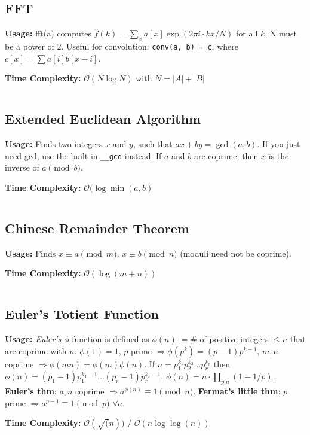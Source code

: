   \subsection{FFT}
    \par \textbf{Usage:} fft(a) computes $\hat f(k) = \sum_x a[x] \exp(2\pi i \cdot k x / N)$ for all $k$. N must be a power of 2.
   Useful for convolution:
   \texttt{conv(a, b) = c}, where $c[x] = \sum a[i]b[x-i]$.
    \par \textbf{Time Complexity:} $\mathcal{O}(N \log N)$ with $N = |A| + |B|$

    \inputminted{cpp}{library/maths/fft.cpp}

  \subsection{Extended Euclidean Algorithm}
    \par \textbf{Usage:} Finds two integers $x$ and $y$, such that $ax+by=\gcd(a,b)$. If
 you just need gcd, use the built in \texttt{\_\_gcd} instead.
 If $a$ and $b$ are coprime, then $x$ is the inverse of $a \pmod{b}$.
    \par \textbf{Time Complexity:} $\mathcal{O}(\log \min(a, b)$

    \inputminted{cpp}{library/maths/euclid.h}
  \subsection{Chinese Remainder Theorem}
    \par \textbf{Usage:} Finds $x \equiv a \pmod m$, $x \equiv b \pmod n$ (moduli need not be coprime).
    \par \textbf{Time Complexity:} $\mathcal{O}(\log(m + n))$
    \inputminted{cpp}{library/maths/crt.hpp}
  \subsection{Euler's Totient Function}
    \par \textbf{Usage:} \emph{Euler's $\phi$} function is defined as $\phi(n):=\#$ of positive integers $\leq n$ that are coprime with $n$.
  $\phi(1)=1$, $p$ prime $\Rightarrow \phi(p^k)=(p-1)p^{k-1}$, $m,n$ coprime $\Rightarrow \phi(mn)=\phi(m)\phi(n)$.
  If $n=p_1^{k_1}p_2^{k_2} ... p_r^{k_r}$ then $\phi(n) = (p_1-1)p_1^{k_1-1}...(p_r-1)p_r^{k_r-1}$.
  $\phi(n)=n \cdot \prod_{p|n}(1-1/p)$.
      \textbf{Euler's thm}: $a,n$ coprime $\Rightarrow a^{\phi(n)} \equiv 1 \pmod{n}$.
     \textbf{Fermat's little thm}: $p$ prime $\Rightarrow a^{p-1} \equiv 1 \pmod{p}$ $\forall a$. 
    \par \textbf{Time Complexity:} $\mathcal{O}(\sqrt(n))$ / $\mathcal{O}(n\log\log(n))$
    \inputminted{cpp}{library/maths/euler_phi.hpp}
